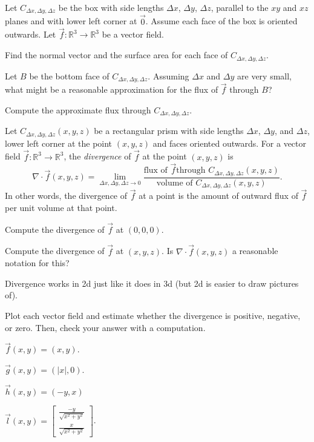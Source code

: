 \documentclass{problemset}
\newcommand{\R}{\mathbb{R}}
\newcommand{\mat}[1]{\begin{bmatrix}#1\end{bmatrix}}
\begin{document}
	\question
	Let $C_{\Delta x,\Delta y,\Delta z}$ be the box with side lengths
	$\Delta x$, $\Delta y$, $\Delta z$, parallel to the $xy$ and $xz$ planes
	and with lower left corner at $\vec 0$.  Assume each face of the box is
	oriented outwards.
	Let $\vec f:\R^3\to\R^3$ be
	a vector field.
	\begin{parts}
		\item Find the normal vector and the surface area for each face of $C_{\Delta x,\Delta y,\Delta z}$.
		\item Let $B$ be the bottom face of $C_{\Delta x,\Delta y,\Delta z}$.  Assuming
			$\Delta x$ and $\Delta y$ are very small, what might be a reasonable
			approximation for the flux of $\vec f$ through $B$?
		\item Compute the approximate flux through $C_{\Delta x,\Delta y,\Delta z}$.
	\end{parts}

	\begin{definition}[Divergence]
		Let $C_{\Delta x,\Delta y,\Delta z}(x,y,z)$ be a rectangular prism with side lengths $\Delta x$, 
		$\Delta y$, and $\Delta z$, lower left corner at the point $(x,y,z)$ and faces oriented outwards.
		For a vector field $\vec f:\R^3\to\R^3$, the \emph{divergence} of $\vec f$ at the point $(x,y,z)$
		is
		\[
			\nabla \cdot \vec f(x,y,z) = \lim_{\Delta x,\Delta y,\Delta z\to 0} \frac{\text{flux of $\vec f$
			through $C_{\Delta x,\Delta y,\Delta z}(x,y,z)$}}{\text{volume of $C_{\Delta x,\Delta y,\Delta z}(x,y,z)$}}.
		\]
		In other words, the divergence of $\vec f$ at a point is the amount of outward flux of $\vec f$
		per unit volume at that point.
	\end{definition}

	\begin{parts}[resume]
		\item Compute the divergence of $\vec f$ at $(0,0,0)$.
		\item Compute the divergence of $\vec f$ at $(x,y,z)$.  Is $\nabla \cdot \vec f(x,y,z)$ a reasonable
			notation for this?
	\end{parts}

	Divergence works in 2d just like it does in 3d (but 2d is easier to draw pictures of).

	\question
	Plot each vector field and estimate whether the divergence is positive,
	negative, or zero.  Then, check your answer with a computation.
	\begin{parts}
		\item $\vec f(x,y) = (x,y)$.
		\item $\vec g(x,y) = (|x|, 0)$.
		\item $\vec h(x,y) = (-y,x)$
		\item $\vec l(x,y) = \mat{\frac{-y}{\sqrt{x^2+y^2}}\\\frac{x}{\sqrt{x^2+y^2}}}$.
	\end{parts}
\end{document}
